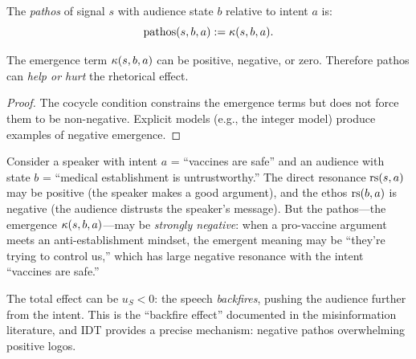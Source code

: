 \begin{definition}
\label{def:pathos}
The \emph{pathos} of signal $s$ with audience state $b$ relative to intent
$a$ is:
\[
  \text{pathos}(s, b, a) := \kappa(s, b, a).
\]
\end{definition}

\begin{theorem}
\label{thm:pathos-negative}
The emergence term $\kappa(s, b, a)$ can be positive, negative, or zero.
Therefore pathos can \emph{help or hurt} the rhetorical effect.
\end{theorem}

\begin{proof}
The cocycle condition constrains the emergence terms but does not force them
to be non-negative.  Explicit models (e.g., the integer model) produce
examples of negative emergence.
\end{proof}

\begin{example}
\label{ex:backfire}
Consider a speaker with intent $a$ = ``vaccines are safe'' and an audience
with state $b$ = ``medical establishment is untrustworthy.''  The direct
resonance $\mathrm{rs}(s, a)$ may be positive (the speaker makes a good argument),
and the ethos $\mathrm{rs}(b, a)$ is negative (the audience distrusts the speaker's
message).  But the pathos---the emergence $\kappa(s, b, a)$---may be
\emph{strongly negative}: when a pro-vaccine argument meets an anti-establishment
mindset, the emergent meaning may be ``they're trying to control us,'' which
has large negative resonance with the intent ``vaccines are safe.''

The total effect can be $u_S < 0$: the speech \emph{backfires}, pushing the
audience further from the intent.  This is the ``backfire effect'' documented
in the misinformation literature, and IDT provides a precise mechanism: negative
pathos overwhelming positive logos.
\end{example}


